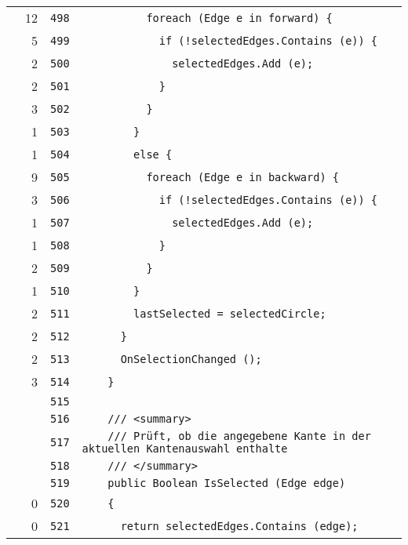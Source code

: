 \documentclass[a4paper,10pt]{article}
\begin{document}
\begin{longtable}[l]{lrrl}
\cellcolor{green} & 12 & \verb~498~ & \verb~          foreach (Edge e in forward) {~\\
\cellcolor{green} & 5 & \verb~499~ & \verb~            if (!selectedEdges.Contains (e)) {~\\
\cellcolor{green} & 2 & \verb~500~ & \verb~              selectedEdges.Add (e);~\\
\cellcolor{green} & 2 & \verb~501~ & \verb~            }~\\
\cellcolor{green} & 3 & \verb~502~ & \verb~          }~\\
\cellcolor{green} & 1 & \verb~503~ & \verb~        }~\\
\cellcolor{green} & 1 & \verb~504~ & \verb~        else {~\\
\cellcolor{green} & 9 & \verb~505~ & \verb~          foreach (Edge e in backward) {~\\
\cellcolor{green} & 3 & \verb~506~ & \verb~            if (!selectedEdges.Contains (e)) {~\\
\cellcolor{green} & 1 & \verb~507~ & \verb~              selectedEdges.Add (e);~\\
\cellcolor{green} & 1 & \verb~508~ & \verb~            }~\\
\cellcolor{green} & 2 & \verb~509~ & \verb~          }~\\
\cellcolor{green} & 1 & \verb~510~ & \verb~        }~\\
\cellcolor{green} & 2 & \verb~511~ & \verb~        lastSelected = selectedCircle;~\\
\cellcolor{green} & 2 & \verb~512~ & \verb~      }~\\
\cellcolor{green} & 2 & \verb~513~ & \verb~      OnSelectionChanged ();~\\
\cellcolor{green} & 3 & \verb~514~ & \verb~    }~\\
\cellcolor{gray} &  & \verb~515~ & \verb~~\\
\cellcolor{gray} &  & \verb~516~ & \verb~    /// <summary>~\\
\cellcolor{gray} &  & \verb~517~ & \verb~    /// Prüft, ob die angegebene Kante in der aktuellen Kantenauswahl enthalte~\\
\cellcolor{gray} &  & \verb~518~ & \verb~    /// </summary>~\\
\cellcolor{gray} &  & \verb~519~ & \verb~    public Boolean IsSelected (Edge edge)~\\
\cellcolor{red} & 0 & \verb~520~ & \verb~    {~\\
\cellcolor{red} & 0 & \verb~521~ & \verb~      return selectedEdges.Contains (edge);~\\

\end{longtable}
\end{document}
